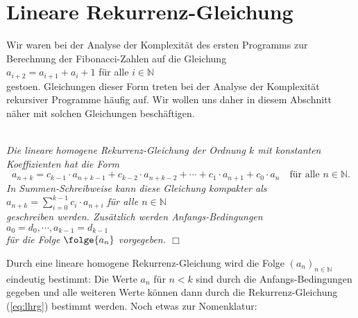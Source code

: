 \section{Lineare Rekurrenz-Gleichung \label{sec:lineare-RG}}
Wir waren bei der Analyse der Komplexit\"{a}t des ersten Programms zur Berechnung der
Fibonacci-Zahlen auf die Gleichung \\[0.2cm]
\hspace*{1.3cm} $a_{i+2} = a_{i+1} + {a_i} + 1$ \quad f\"{u}r alle $i \in \mathbb{N}$ \\[0.2cm]
gesto\3en. Gleichungen dieser Form treten bei der Analyse der Komplexit\"{a}t rekursiver
Programme h\"{a}ufig auf. Wir wollen uns daher in diesem Abschnitt n\"{a}her mit solchen
Gleichungen besch\"{a}ftigen.

\begin{Definition} \hspace*{\fill} \\
{\em 
  Die \emph{lineare homogene Rekurrenz-Gleichung der Ordnung $k$ mit konstanten Koeffizienten} hat die Form
  \begin{equation}
    \label{eq:lhrg}
  a_{n+k} = c_{k-1} \cdot a_{n+k-1} + c_{k-2} \cdot a_{n+k-2} + \cdots + c_1 \cdot a_{n+1} + c_0 \cdot a_{n}
     \quad \mbox{f\"{u}r alle $n \in \mathbb{N}$}. 
  \end{equation}
     In Summen-Schreibweise kann diese Gleichung kompakter als 
     \\[0.2cm]
     \hspace*{1.3cm}
     $a_{n+k} = \sum\limits_{i=0}^{k-1} c_i \cdot a_{n+i}$ \quad f\"{u}r alle $n \in \mathbb{N}$
     \\[0.2cm]
     geschreiben werden.
     Zus\"{a}tzlich werden \emph{Anfangs-Bedingungen}  
      \\[0.2cm]
      \hspace*{1.3cm}      
      $a_0 = d_0, \cdots, a_{k-1} = d_{k-1}$ 
      \\[0.2cm]
      f\"{u}r die Folge $\folge{a_n}$ vorgegeben.    
    \hspace*{\fill} $\Box$
}
\end{Definition}
Durch eine lineare homogene Rekurrenz-Gleichung wird die Folge $(a_n)_{n\in\mathbb{N}}$
eindeutig bestimmt: Die Werte $a_n$ f\"{u}r $n < k$ sind durch die Anfangs-Bedingungen gegeben und
alle weiteren Werte k\"{o}nnen dann durch die Rekurrenz-Gleichung (\ref{eq:lhrg}) bestimmt werden.
Noch  etwas zur Nomenklatur:
